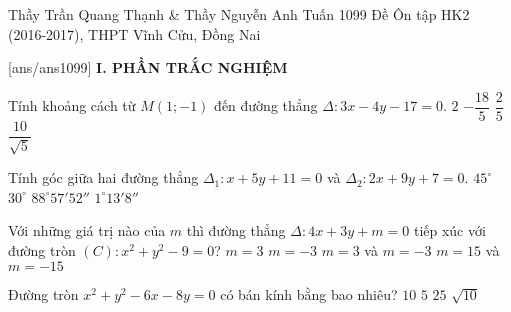 \begin{name}
{Thầy Trần Quang Thạnh \& Thầy Nguyễn Anh Tuấn}
{1099 Đề Ôn tập HK2 (2016-2017), THPT Vĩnh Cửu, Đồng Nai}
	\end{name}
	\setcounter{ex}{0}\setcounter{bt}{0}
	[ans/ans1099]
\noindent\textbf{I. PHẦN TRẮC NGHIỆM}
\begin{ex}%
	Tính khoảng cách từ $M(1;-1)$ đến đường thẳng $\Delta: 3x-4y-17=0$.
	\choice
	{\True $2 $}
	{$-\dfrac{18}{5} $}
	{$\dfrac{2}{5} $}
	{$\dfrac{10}{\sqrt{5}} $}
\end{ex}

\begin{ex}%
	Tính góc giữa hai đường thẳng $\Delta_1: x+5y+11=0$ và $\Delta_2: 2x+9y+7=0$.
	\choice
	{$45^{\circ} $}
	{$30^{\circ} $}
	{\True $88^{\circ}57'52'' $}
	{$1^{\circ}13'8'' $}
\end{ex}

\begin{ex}%
	Với những giá trị nào của $m$ thì đường thẳng $\Delta: 4x+3y+m=0$ tiếp xúc với đường tròn $(C): x^2+y^2-9=0$?
	\choice
	{$m=3 $}
	{$m=-3 $}
	{$m=3 $ và $m=-3$}
	{\True $m=15 $ và $m=-15$}
\end{ex}

\begin{ex}%
	Đường tròn $x^2+y^2-6x-8y=0$ có bán kính bằng bao nhiêu?
	\choice
	{$10 $}
	{\True $5 $}
	{$25 $}
	{$\sqrt{10} $}
\end{ex}

